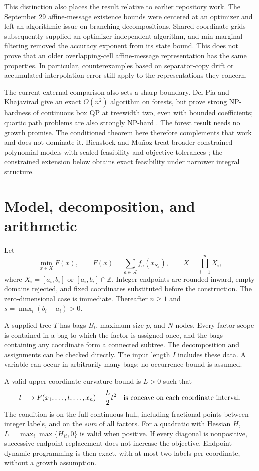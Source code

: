 \documentclass[11pt]{article}
\theoremstyle{remark}
\newcommand{\Z}{\mathbb Z}
\begin{document}
This distinction also places the result relative to earlier repository
work. The September 29 affine-message existence bounds were centered at
an optimizer and left an algorithmic issue on branching decompositions.
Shared-coordinate grids subsequently supplied an optimizer-independent
algorithm, and min-marginal filtering removed the accuracy exponent from
its state bound. This does not prove that an older overlapping-cell
affine-message representation has the same properties. In particular,
counterexamples based on separator-copy drift or accumulated interpolation
error still apply to the representations they concern.

The current external comparison also sets a sharp boundary. Del Pia and
Khajavirad give an exact $O(n^2)$ algorithm on forests, but prove strong
NP-hardness of continuous box QP at treewidth two, even with bounded
coefficients; quartic path problems are also strongly NP-hard
\cite{DelPiaKhajavirad2026}. The forest result needs no growth promise.
The conditioned theorem here therefore complements that work and does
not dominate it. Bienstock and Mu\~noz treat broader constrained polynomial
models with scaled feasibility and objective tolerances
\cite{BienstockMunoz2018}; the constrained extension below obtains exact
feasibility under narrower integral structure.

\section{Model, decomposition, and arithmetic}\label{sec:model}

Let
\begin{equation}\label{eq:model}
\min_{x\in X}F(x),\qquad F(x)=\sum_{a\in\mathcal A}f_a(x_{S_a}),
\qquad X=\prod_{i=1}^n X_i,
\end{equation}
where $X_i=[a_i,b_i]$ or $[a_i,b_i]\cap\Z$. Integer endpoints are
rounded inward, empty domains rejected, and fixed coordinates substituted
before the construction. The zero-dimensional case is immediate.
Thereafter $n\ge1$ and $s=\max_i(b_i-a_i)>0$.

A supplied tree $T$ has bags $B_t$, maximum size $p$, and $N$ nodes.
Every factor scope is contained in a bag to which the factor is assigned
once, and the bags containing any coordinate form a connected subtree.
The decomposition and assignments can be checked directly. The input
length $I$ includes these data. A variable can occur in arbitrarily many
bags; no occurrence bound is assumed.

A valid upper coordinate-curvature bound is $L>0$ such that
\begin{equation}\label{eq:semiconcavity}
t\longmapsto F(x_1,\ldots,t,\ldots,x_n)-\frac L2t^2
\quad\hbox{is concave on each coordinate interval.}
\end{equation}
The condition is on the full continuous hull, including fractional points
between integer labels, and on the \emph{sum} of all factors. For a quadratic
with Hessian $H$, $L=\max_i\max\{H_{ii},0\}$ is valid when positive.
If every diagonal is nonpositive, successive endpoint replacement does
not increase the objective. Endpoint dynamic programming is then exact,
with at most two labels per coordinate, without a growth assumption.
\end{document}

